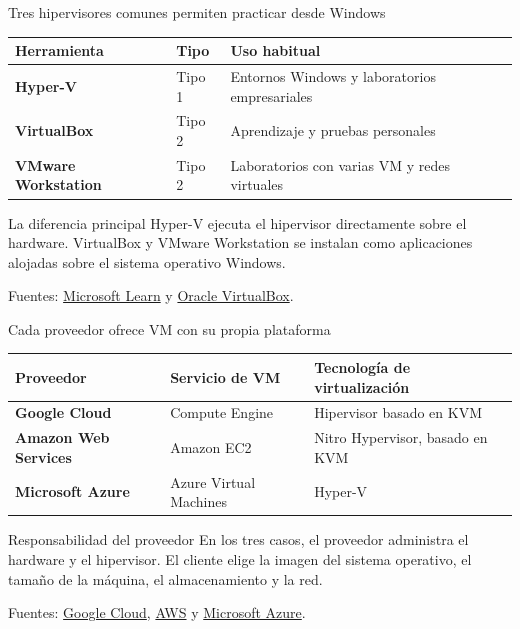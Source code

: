\documentclass[aspectratio=169,10pt,c]{beamer}
\begin{document}
\begin{frame}{Tres hipervisores comunes permiten practicar desde Windows}
\small
\begin{tabular}{>{\bfseries}p{3.25cm}p{2.0cm}p{6.3cm}}
\toprule
Herramienta & Tipo & Uso habitual\\
\midrule
Hyper-V & Tipo 1 & Entornos Windows y laboratorios empresariales\\
VirtualBox & Tipo 2 & Aprendizaje y pruebas personales\\
VMware Workstation & Tipo 2 & Laboratorios con varias VM y redes virtuales\\
\bottomrule
\end{tabular}
\vspace{0.45cm}
\begin{alertblock}{La diferencia principal}
\small Hyper-V ejecuta el hipervisor directamente sobre el hardware. VirtualBox y VMware Workstation se instalan como aplicaciones alojadas sobre el sistema operativo Windows.
\end{alertblock}
\vspace{0.05cm}
{\tiny Fuentes: \href{https://learn.microsoft.com/en-us/windows-server/virtualization/hyper-v/overview}{Microsoft Learn} y \href{https://www.virtualbox.org/manual/}{Oracle VirtualBox}.}
\end{frame}

\begin{frame}{Cada proveedor ofrece VM con su propia plataforma}
\begin{center}
\small
\begin{tabular}{>{\bfseries}p{4.0cm}p{3.35cm}p{4.0cm}}
\toprule
Proveedor & Servicio de VM & Tecnología de virtualización\\
\midrule
Google Cloud & Compute Engine & Hipervisor basado en KVM\\
Amazon Web Services & Amazon EC2 & Nitro Hypervisor, basado en KVM\\
Microsoft Azure & Azure Virtual Machines & Hyper-V\\
\bottomrule
\end{tabular}
\end{center}
\vspace{0.4cm}
\begin{exampleblock}{Responsabilidad del proveedor}
\small En los tres casos, el proveedor administra el hardware y el hipervisor. El cliente elige la imagen del sistema operativo, el tamaño de la máquina, el almacenamiento y la red.
\end{exampleblock}
\vspace{0.05cm}
{\tiny Fuentes: \href{https://docs.cloud.google.com/compute/docs/instances/nested-virtualization/overview}{Google Cloud}, \href{https://docs.aws.amazon.com/ec2/latest/instancetypes/ec2-nitro-instances.html}{AWS} y \href{https://learn.microsoft.com/en-ie/azure/security/fundamentals/isolation-choices}{Microsoft Azure}.}
\end{frame}
\end{document}
